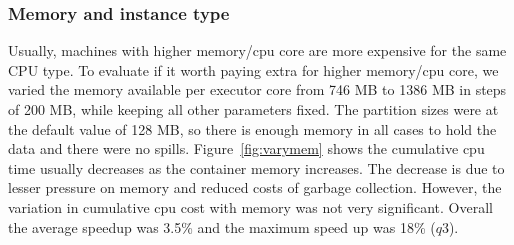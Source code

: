 \noindent\subsubsection*{Memory and instance type}
 Usually, machines with higher memory/cpu core are more expensive for the same CPU type. To evaluate if it worth paying extra for higher memory/cpu core, we  varied the memory available per executor core from 746 MB to 1386 MB in steps of 200 MB, while keeping all other parameters fixed.   The partition sizes were at the default value of 128 MB, so there is enough memory in all cases to hold the data and there were no spills. Figure~\ref{fig:varymem} shows  the cumulative cpu time usually decreases as the container memory increases. The decrease is due to lesser pressure on memory and reduced costs of garbage collection.  However, the variation in cumulative cpu cost with memory was not very significant. Overall the average speedup was 3.5\% and the maximum speed up was 18\% ($q3$). 


